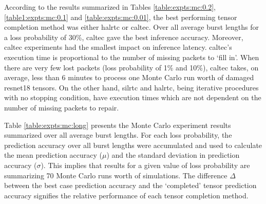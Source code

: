 According to the results summarized in Tables \ref{table:expts:mc:0.2}, \ref{table1:expts:mc:0.1} and \ref{table:expts:mc:0.01}, the best performing tensor completion method was either \gls{halrtc} or \gls{caltec}. Over all average burst lengths for a loss probability of 30\%, \gls{caltec} gave the best inference accuracy. Moreover, \gls{caltec} experiments had the smallest impact on inference latency. \gls{caltec}'s execution time is proportional to the number of missing packets to `fill in'. When there are very few lost packets (loss probability of 1\% and 10\%), \gls{caltec} takes, on average, less than 6 minutes to process one Monte Carlo run worth of damaged \gls{resnet18} tensors. On the other hand, \gls{silrtc} and \gls{halrtc}, being iterative procedures with no stopping condition, have execution times which are not dependent on the number of missing packets to repair.

Table \ref{table:expts:mc:long} presents the Monte Carlo experiment results summarized over all average burst lengths. For each loss probability, the prediction accuracy over all burst lengths were accumulated and used to calculate the mean prediction accuracy ($\mu$) and the standard deviation in prediction accuracy ($\sigma$). This implies that results for a given value of loss probability are summarizing 70 Monte Carlo runs worth of simulations. The difference $\Delta$ between the best case prediction accuracy and the `completed' tensor prediction accuracy signifies the relative performance of each tensor completion method.

